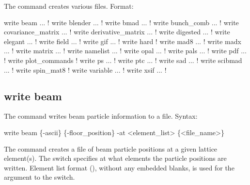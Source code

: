 {{{{{{{{{{{{The  command creates various files.
Format:
\begin{example}
  write beam ...                  ! 
  write blender ...               ! 
  write bmad ...                  ! 
  write bunch_comb ...            ! 
  write covariance_matrix ...     ! 
  write derivative_matrix ...     ! 
  write digested ...              ! 
  write elegant ...               ! 
  write field ...                 ! 
  write gif ...                   ! 
  write hard                      ! 
  write mad8 ...                  ! 
  write madx ...                  ! 
  write matrix ...                ! 
  write namelist ...              ! 
  write opal ...                  ! 
  write pals ...                  ! 
  write pdf ...                   !   
  write plot_commands             ! 
  write ps ...                    !   
  write ptc ...                   ! 
  write sad ...                   ! 
  write scibmad ...               ! 
  write spin_mat8                 ! 
  write variable ...              ! 
  write xsif ...                  ! 
\end{example}



\subsection{write beam}
\label{s:write.beam}

The  command writes beam particle information to a file.
Syntax:
\begin{example}
    write beam \{-ascii\} \{-floor_position\} -at <element_list> \{<file_name>\} 
\end{example}

The  command creates a file of beam particle positions at a given lattice element(s). The
 switch specifies at what elements the particle positions are written. Element list format
(), without any embedded blanks, is used for the 
argument to the  switch. 

}}}}}}}}}}}}
